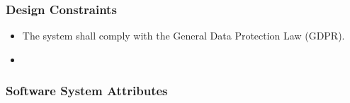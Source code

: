 \subsubsection{Design Constraints}
\begin{itemize}
    \item The system shall comply with the General Data Protection Law (GDPR).
    \item 
\end{itemize}





\subsubsection{Software System Attributes}


